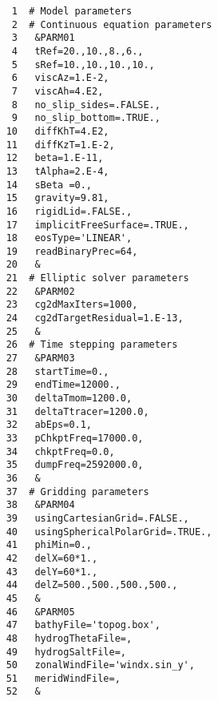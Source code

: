 
\begin{verbatim}
     1	# Model parameters
     2	# Continuous equation parameters
     3	 &PARM01
     4	 tRef=20.,10.,8.,6.,
     5	 sRef=10.,10.,10.,10.,
     6	 viscAz=1.E-2,
     7	 viscAh=4.E2,
     8	 no_slip_sides=.FALSE.,
     9	 no_slip_bottom=.TRUE.,
    10	 diffKhT=4.E2,
    11	 diffKzT=1.E-2,
    12	 beta=1.E-11,
    13	 tAlpha=2.E-4,
    14	 sBeta =0.,
    15	 gravity=9.81,
    16	 rigidLid=.FALSE.,
    17	 implicitFreeSurface=.TRUE.,
    18	 eosType='LINEAR',
    19	 readBinaryPrec=64,
    20	 &
    21	# Elliptic solver parameters
    22	 &PARM02
    23	 cg2dMaxIters=1000,
    24	 cg2dTargetResidual=1.E-13,
    25	 &
    26	# Time stepping parameters
    27	 &PARM03
    28	 startTime=0.,
    29	 endTime=12000., 
    30	 deltaTmom=1200.0,
    31	 deltaTtracer=1200.0,
    32	 abEps=0.1,
    33	 pChkptFreq=17000.0,
    34	 chkptFreq=0.0,
    35	 dumpFreq=2592000.0,
    36	 &
    37	# Gridding parameters
    38	 &PARM04
    39	 usingCartesianGrid=.FALSE.,
    40	 usingSphericalPolarGrid=.TRUE.,
    41	 phiMin=0.,
    42	 delX=60*1.,
    43	 delY=60*1.,
    44	 delZ=500.,500.,500.,500.,
    45	 &
    46	 &PARM05
    47	 bathyFile='topog.box',
    48	 hydrogThetaFile=,
    49	 hydrogSaltFile=,
    50	 zonalWindFile='windx.sin_y',
    51	 meridWindFile=,
    52	 &
\end{verbatim}
